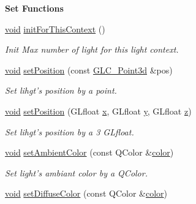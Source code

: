 \begin{Indent}{\bf Set Functions}\par
\begin{DoxyCompactItemize}
\item 
\hyperlink{group___u_a_v_objects_plugin_ga444cf2ff3f0ecbe028adce838d373f5c}{void} \hyperlink{class_g_l_c___light_a8da184bdaa003551465a21a9e36bc319}{init\-For\-This\-Context} ()
\begin{DoxyCompactList}\small\item\em Init Max number of light for this light context. \end{DoxyCompactList}\item 
\hyperlink{group___u_a_v_objects_plugin_ga444cf2ff3f0ecbe028adce838d373f5c}{void} \hyperlink{class_g_l_c___light_a72acd1dfcf42f4e4783666954ad9d716}{set\-Position} (const \hyperlink{glc__vector3d_8h_a4e13a9bbc7ab3d34de7e98b41836772c}{G\-L\-C\-\_\-\-Point3d} \&pos)
\begin{DoxyCompactList}\small\item\em Set lihgt's position by a point. \end{DoxyCompactList}\item 
\hyperlink{group___u_a_v_objects_plugin_ga444cf2ff3f0ecbe028adce838d373f5c}{void} \hyperlink{class_g_l_c___light_abd04f4f1df3285ed1e7a745921345e6e}{set\-Position} (G\-Lfloat \hyperlink{glext_8h_a1db9d104e3c2128177f26aff7b46982f}{x}, G\-Lfloat \hyperlink{glext_8h_a42315f3ed8fff752bb47fd782309fcfc}{y}, G\-Lfloat \hyperlink{glext_8h_a642c8d69fd1a54f255c898df4f0dd7ca}{z})
\begin{DoxyCompactList}\small\item\em Set lihgt's position by a 3 G\-Lfloat. \end{DoxyCompactList}\item 
\hyperlink{group___u_a_v_objects_plugin_ga444cf2ff3f0ecbe028adce838d373f5c}{void} \hyperlink{class_g_l_c___light_a61bbf7ccbcc76585eedd6ff2b73ba0a0}{set\-Ambient\-Color} (const Q\-Color \&\hyperlink{glext_8h_a3ea846f998d64f079b86052b6c4193a8}{color})
\begin{DoxyCompactList}\small\item\em Set light's ambiant color by a Q\-Color. \end{DoxyCompactList}\item 
\hyperlink{group___u_a_v_objects_plugin_ga444cf2ff3f0ecbe028adce838d373f5c}{void} \hyperlink{class_g_l_c___light_a698f1054bdc8283359d1f9a30b5d7b35}{set\-Diffuse\-Color} (const Q\-Color \&\hyperlink{glext_8h_a3ea846f998d64f079b86052b6c4193a8}{color})

\end{DoxyCompactItemize}
\end{Indent}
